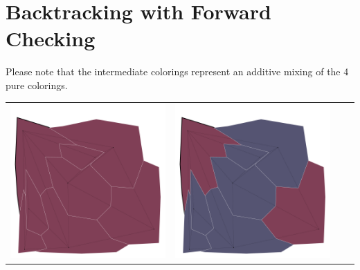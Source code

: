 \documentclass[10pt,a4paper]{article}
\begin{document}
\section{Backtracking with Forward Checking}
Please note that the intermediate colorings represent an additive mixing of the 4 pure colorings.\\
\begin{tabular}{c c c c }
	\includegraphics[scale=.10]{../results/backtracking_forward/map_build/bt_forward_I00001.pdf}&
	\includegraphics[scale=.10]{../results/backtracking_forward/map_build/bt_forward_I00002.pdf}&

\end{tabular}
\end{document}
